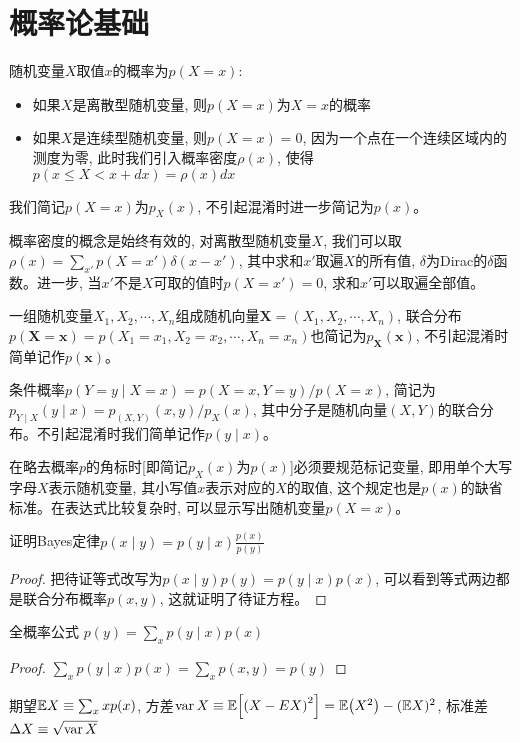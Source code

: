 \chapter*{概率论基础}
\par 随机变量$X$取值$x$的概率为$p(X=x)$:
\begin{itemize}
    \item 如果$X$是离散型随机变量, 则$p(X=x)$为$X=x$的概率
    \item 如果$X$是连续型随机变量, 则$p(X=x)=0$, 因为一个点在一个连续区域内的测度为零, 此时我们引入概率密度$\rho(x)$, 使得$p(x\leq X<x+dx)=\rho(x)dx$
\end{itemize}
我们简记$p(X=x)$为$p_X(x)$, 不引起混淆时进一步简记为$p(x)$。
\par 概率密度的概念是始终有效的, 对离散型随机变量$X$, 我们可以取$\rho(x)=\sum_{x'}p(X=x')\delta(x-x')$, 其中求和$x'$取遍$X$的所有值, $\delta$为Dirac的$\delta$函数。进一步, 当$x'$不是$X$可取的值时$p(X=x')=0$, 求和$x'$可以取遍全部值。
\par 一组随机变量$X_1,X_2,\cdots,X_n$组成随机向量$\bm X=(X_1,X_2,\cdots,X_n)$, 联合分布$p(\bm X=\bm x)=p(X_1=x_1,X_2=x_2,\cdots,X_n=x_n)$也简记为$p_{\bm X}(\bm x)$, 不引起混淆时简单记作$p(\bm x)$。
\par 条件概率$p(Y=y\mid X=x)=p(X=x,Y=y)/p(X=x)$, 简记为$p_{Y\mid X}(y\mid x)=p_{(X,Y)}(x,y)/p_X(x)$, 其中分子是随机向量$(X,Y)$的联合分布。不引起混淆时我们简单记作$p(y\mid x)$。
\par{}\quad 在略去概率$p$的角标时[即简记$p_X(x)$为$p(x)$]必须要规范标记变量, 即用单个大写字母$X$表示随机变量, 其小写值$x$表示对应的$X$的取值, 这个规定也是$p(x)$的缺省标准。在表达式比较复杂时, 可以显示写出随机变量$p(X=x)$。
\begin{exercise}[A.1] 证明Bayes定律$p(x\mid y)=p(y\mid x)\frac{p(x)}{p(y)}$
\end{exercise}
\begin{proof}
    把待证等式改写为$p(x\mid y)p(y)=p(y\mid x)p(x)$, 可以看到等式两边都是联合分布概率$p(x,y)$, 这就证明了待证方程。
\end{proof}
\begin{exercise}[A.2]
    全概率公式 $p(y)=\sum_x p(y\mid x)p(x)$
\end{exercise}
\begin{proof}
    $\sum_x p(y\mid x)p(x)=\sum_x p(x,y)=p(y)$
\end{proof}
\par 期望$\mathbb{E} X\equiv\sum_x xp(x)$, 方差$\operatorname{{\rm var}} X\equiv\mathbb{E}\qty[\qty(X-EX)^2]=\mathbb{E}\qty(X^2)-(\mathbb{E} X)^2$, 标准差$\Delta X\equiv\sqrt{\operatorname{{\rm var}} X}$
